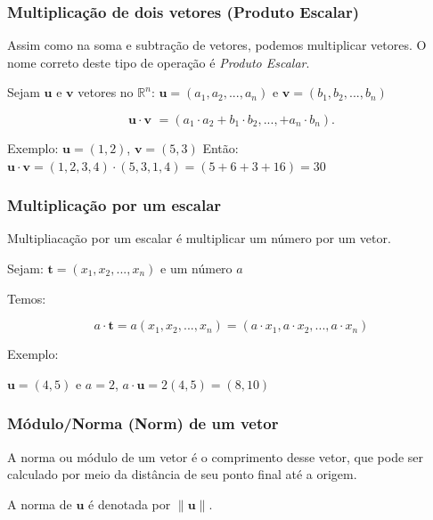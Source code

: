 \documentclass[12pt]{article}
\begin{document}
\subsubsection{Multiplicação de dois vetores (Produto Escalar)}

Assim como na soma e subtração de vetores, podemos multiplicar vetores. O nome correto deste tipo de operação é \textit{Produto Escalar}.

Sejam \(\textbf{u}\) e \(\textbf{v}\) vetores no \(\mathbb{R}^n\): \(\textbf{u}=(a_{1}, a_{2},...,a_{n})\) e \(\textbf{v}=(b_{1}, b_{2},...,b_{n})\)

\begin{equation}
\textbf{u} \cdot \textbf{v }= (a_{1} \cdot a_{2} + b_{1} \cdot b_{2} ,..., + a_{n} \cdot b_{n}).
\end{equation}

Exemplo: \(\textbf{u} = (1,2)\), \(\textbf{v} = (5, 3)\)
Então: \(\textbf{u} \cdot \textbf{v} = (1, 2, 3, 4) \cdot (5, 3, 1, 4) = (5 + 6 + 3 + 16) = 30\)

\subsubsection{Multiplicação por um escalar}

Multipliacação por um escalar é multiplicar um número por um vetor.

Sejam: \(\textbf{t} = (x_{1}, x_{2}, ..., x_{n})\) e um número \(\textit{a}\)

Temos:

\begin{equation}
\textit{a}\cdot\textbf{t} = \textit{a}(x_{1}, x_{2}, ..., x_{n}) = (\textit{a} \cdot x_{1}, \textit{a} \cdot x_{2}, ..., \textit{a} \cdot x_{n})
\end{equation}

Exemplo:

\(\textbf{u} = (4, 5)\) e \(\textit{a} = 2\), \(\textit{a}\cdot\textbf{u} = 2(4, 5) = (8, 10)\)

\subsubsection{Módulo/Norma (Norm) de um vetor}

A norma ou módulo de um vetor é o comprimento desse vetor, que pode ser calculado por meio da distância de seu ponto final até a origem.

A norma de \( \textbf{u} \) é denotada por \( \| \textbf{u} \| \).
\end{document}
